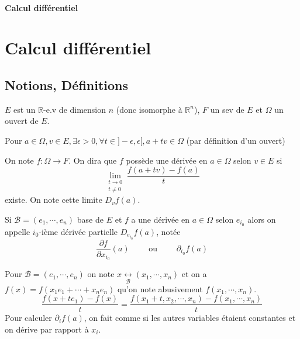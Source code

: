 \ifsolo
~

\vspace{1cm}

\begin{center}
    \textbf{\LARGE Calcul différentiel} \\[1em]
\end{center}
\tableofcontents
\else
    \chapter{Calcul différentiel}

    \minitoc
\fi
\thispagestyle{empty}

\ifsolo \newpage \setcounter{page}{1} \fi
\section{Notions, Définitions}

$E$ est un $\mathbb R$-e.v de dimension $n$ (donc isomorphe à $\mathbb R^n$), $F$ un sev de $E$ et $\Omega$ un ouvert de $E$.

\begin{rem}
    Pour $a\in\Omega, v\in E, \exists \epsilon>0, \forall t\in ]-\epsilon, \epsilon[, a+tv\in\Omega$ (par définition d'un ouvert)
\end{rem}

\begin{dfn}
    On note $f:\Omega \longrightarrow F$. On dira que $f$ possède une dérivée en $a\in\Omega$ selon $v\in E$ si \[
        \lim_{\substack{t\to 0\\ t\neq 0}}\frac{f(a+tv)-f(a)}t
    \] existe. On note cette limite $D_vf(a)$.

    Si $\mathcal B=(e_1,\cdots, e_n)$ base de $E$ et $f$ a une dérivée en $a\in\Omega$ selon $e_{i_0}$ alors on appelle $i_0$-ième dérivée partielle $D_{e_{i_0}}f(a)$, notée \[
        \frac{\partial f}{\partial x_{i_0}}(a)\qquad \text{ ou }\qquad \partial_{i_0}f(a)
    \]
\end{dfn}

\begin{rem}
    Pour $\mathcal B=(e_1, \cdots, e_n)$ on note $x\underset{\mathcal B}{\longleftrightarrow}(x_1, \cdots, x_n)$ et on a $f(x)=f(x_1e_1+\cdots + x_ne_n)$ qu'on note abusivement $f(x_1, \cdots, x_n)$. \[
        \frac{f(x+te_1)-f(x)}{t}=\frac{f(x_1+t, x_2, \cdots, x_n)-f(x_1, \cdots, x_n)}{t}
    \]
    Pour calculer $\partial_if(a)$, on fait comme si les autres variables étaient constantes et on dérive par rapport à $x_i$.
\end{rem}

